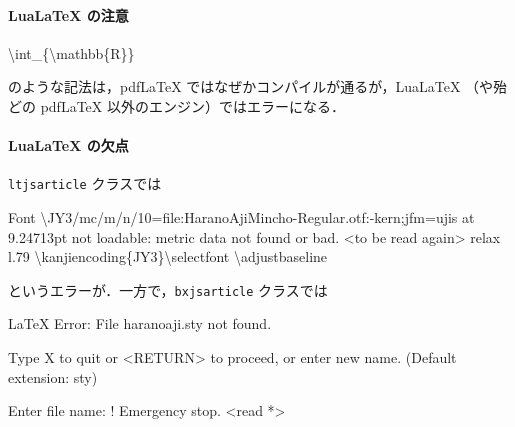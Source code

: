 \documentclass[
]{ltjsarticle}
\newenvironment{Shaded}{\begin{snugshade}}{\end{snugshade}}
\newcommand{\DataTypeTok}[1]{\textcolor[rgb]{0.68,0.00,0.00}{#1}}
\newcommand{\ExtensionTok}[1]{\textcolor[rgb]{0.00,0.23,0.31}{#1}}
\newcommand{\FunctionTok}[1]{\textcolor[rgb]{0.28,0.35,0.67}{#1}}
\newcommand{\KeywordTok}[1]{\textcolor[rgb]{0.00,0.23,0.31}{#1}}
\newcommand{\NormalTok}[1]{\textcolor[rgb]{0.00,0.23,0.31}{#1}}
\newcommand{\OperatorTok}[1]{\textcolor[rgb]{0.37,0.37,0.37}{#1}}
\newcommand{\StringTok}[1]{\textcolor[rgb]{0.13,0.47,0.30}{#1}}
\newcommand{\VariableTok}[1]{\textcolor[rgb]{0.07,0.07,0.07}{#1}}
\begin{document}
\paragraph{LuaLaTeX の注意}\label{lualatex-ux306eux6ce8ux610f}

\begin{Shaded}
\begin{Highlighting}[]
\FunctionTok{\textbackslash{}int}\NormalTok{\_\{}\FunctionTok{\textbackslash{}mathbb}\NormalTok{\{R\}\}}
\end{Highlighting}
\end{Shaded}

のような記法は，pdfLaTeX ではなぜかコンパイルが通るが，LuaLaTeX
（や殆どの pdfLaTeX 以外のエンジン）ではエラーになる．

\paragraph{LuaLaTeX の欠点}\label{lualatex-ux306eux6b20ux70b9}

\texttt{ltjsarticle} クラスでは

\begin{Shaded}
\begin{Highlighting}[]
\ExtensionTok{Font} \DataTypeTok{\textbackslash{}J}\NormalTok{Y3/mc/m/n/10=file:HaranoAjiMincho{-}Regular.otf:{-}kern}\KeywordTok{;}\VariableTok{jfm}\OperatorTok{=}\NormalTok{ujis }\ExtensionTok{at}\NormalTok{ 9.24713pt not loadable: metric data not found or bad.}
\OperatorTok{\textless{}}\NormalTok{to }\ExtensionTok{be}\NormalTok{ read again}\OperatorTok{\textgreater{}} 
\ExtensionTok{relax} 
\ExtensionTok{l.79} \DataTypeTok{\textbackslash{}k}\NormalTok{anjiencoding\{JY3\}}\DataTypeTok{\textbackslash{}s}\NormalTok{electfont}
                                 \ExtensionTok{\textbackslash{}adjustbaseline}
\end{Highlighting}
\end{Shaded}

というエラーが．一方で，\texttt{bxjsarticle} クラスでは

\begin{Shaded}
\begin{Highlighting}[]
\ExtensionTok{LaTeX}\NormalTok{ Error: File }\KeywordTok{\textasciigrave{}}\ExtensionTok{haranoaji.sty}\StringTok{\textquotesingle{} not found.}

\StringTok{Type X to quit or \textless{}RETURN\textgreater{} to proceed,}
\StringTok{or enter new name. (Default extension: sty)}

\StringTok{Enter file name: }
\StringTok{! Emergency stop.}
\StringTok{\textless{}read *\textgreater{}}
\end{Highlighting}
\end{Shaded}
\end{document}
